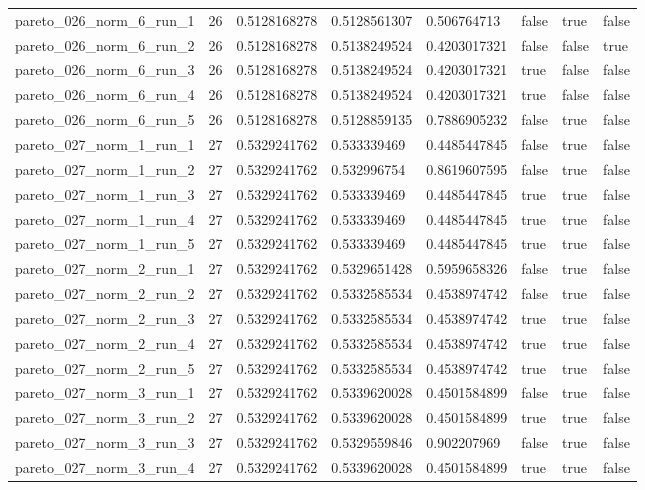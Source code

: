 \begin{tabular}{@{}llllllll@{}}
pareto\_026\_norm\_6\_run\_1 & 26 & 0.5128168278 & 0.5128561307 & 0.506764713 & false & true & false \\
pareto\_026\_norm\_6\_run\_2 & 26 & 0.5128168278 & 0.5138249524 & 0.4203017321 & false & false & true \\
pareto\_026\_norm\_6\_run\_3 & 26 & 0.5128168278 & 0.5138249524 & 0.4203017321 & true & false & false \\
pareto\_026\_norm\_6\_run\_4 & 26 & 0.5128168278 & 0.5138249524 & 0.4203017321 & true & false & false \\
pareto\_026\_norm\_6\_run\_5 & 26 & 0.5128168278 & 0.5128859135 & 0.7886905232 & false & true & false \\
pareto\_027\_norm\_1\_run\_1 & 27 & 0.5329241762 & 0.533339469 & 0.4485447845 & false & true & false \\
pareto\_027\_norm\_1\_run\_2 & 27 & 0.5329241762 & 0.532996754 & 0.8619607595 & false & true & false \\
pareto\_027\_norm\_1\_run\_3 & 27 & 0.5329241762 & 0.533339469 & 0.4485447845 & true & true & false \\
pareto\_027\_norm\_1\_run\_4 & 27 & 0.5329241762 & 0.533339469 & 0.4485447845 & true & true & false \\
pareto\_027\_norm\_1\_run\_5 & 27 & 0.5329241762 & 0.533339469 & 0.4485447845 & true & true & false \\
pareto\_027\_norm\_2\_run\_1 & 27 & 0.5329241762 & 0.5329651428 & 0.5959658326 & false & true & false \\
pareto\_027\_norm\_2\_run\_2 & 27 & 0.5329241762 & 0.5332585534 & 0.4538974742 & false & true & false \\
pareto\_027\_norm\_2\_run\_3 & 27 & 0.5329241762 & 0.5332585534 & 0.4538974742 & true & true & false \\
pareto\_027\_norm\_2\_run\_4 & 27 & 0.5329241762 & 0.5332585534 & 0.4538974742 & true & true & false \\
pareto\_027\_norm\_2\_run\_5 & 27 & 0.5329241762 & 0.5332585534 & 0.4538974742 & true & true & false \\
pareto\_027\_norm\_3\_run\_1 & 27 & 0.5329241762 & 0.5339620028 & 0.4501584899 & false & true & false \\
pareto\_027\_norm\_3\_run\_2 & 27 & 0.5329241762 & 0.5339620028 & 0.4501584899 & true & true & false \\
pareto\_027\_norm\_3\_run\_3 & 27 & 0.5329241762 & 0.5329559846 & 0.902207969 & false & true & false \\
pareto\_027\_norm\_3\_run\_4 & 27 & 0.5329241762 & 0.5339620028 & 0.4501584899 & true & true & false \\

\end{tabular}
